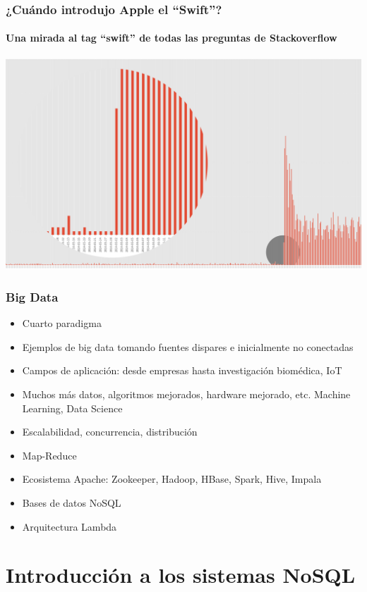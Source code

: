 \documentclass[14pt]{beamer}
\begin{document}
\begin{frame}
  \frametitle{¿Cuándo introdujo Apple el ``Swift''?}
  \framesubtitle{Una mirada al tag ``swift'' de todas las preguntas de
    Stackoverflow}
\includegraphics[width=\textwidth]{img/swift-tag}
\end{frame}

\begin{frame}[allowframebreaks]
  \frametitle{Big Data}
  \begin{itemize}
  \item Cuarto paradigma
  \item Ejemplos de big data tomando fuentes dispares e inicialmente no
    conectadas
  \item Campos de aplicación: desde empresas hasta investigación biomédica,
    IoT
  \item Muchos más datos, algoritmos mejorados, hardware mejorado, etc.
    Machine Learning, Data Science
  \item Escalabilidad, concurrencia, distribución
  \item Map-Reduce
  \item Ecosistema Apache: Zookeeper, Hadoop, HBase, Spark, Hive, Impala
  \item Bases de datos NoSQL
  \item Arquitectura Lambda
  \end{itemize}
\end{frame}

\section{Introducción a los sistemas NoSQL}
\end{document}

